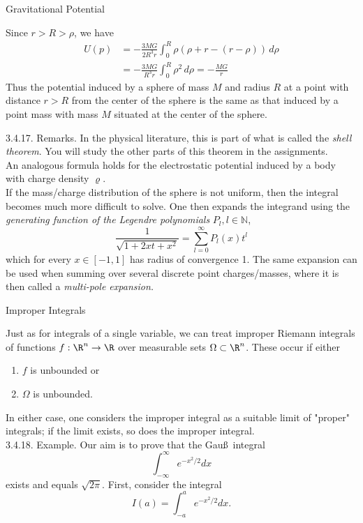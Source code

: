 \documentclass[smaller,hyperref={CJKbookmarks=true}]{beamer}
\newcommand{\N}{\mathbb{N}}
\begin{document}
\begin{frame}{Gravitational Potential}
\begin{spacing}{0.9}
Since $r>R>\rho$, we have
\begin{equation*}
  \begin{split}
     U(p) &=-\frac{3MG}{2R^3r}\int_{0}^{R}\rho(\rho+r-(r-\rho))\,d\rho \\
       &=-\frac{3MG}{R^3r}\int_{0}^{R}\rho^2\,d\rho=-\frac{MG}{r}
  \end{split}
\end{equation*}
Thus the potential induced by a sphere of mass $M$ and radius $R$ at a point with distance $r>R$ from the center of the sphere is the same as that induced by a point mass with mass $M$ situated at the center of the sphere.
\end{spacing}
\newpage
\begin{spacing}{1.05}
\alert{3.4.17. Remarks.} In the physical literature, this is part of what is called the
\emph{shell theorem}. You will study the other parts of this theorem in the
assignments.\\[5pt]
An analogous formula holds for the electrostatic potential induced by a
body with charge density $\varrho$.\\[5pt]
If the mass/charge distribution of the sphere is not uniform, then the
integral becomes much more dif{}ficult to solve. One then expands the
integrand using the \emph{generating function of the Legendre polynomials} $P_l,l\in\N$,
\[\frac{1}{\sqrt{1+2xt+x^2}}=\sum_{l=0}^{\infty}
P_l(x)t^l\]
which for every $x\in[-1,1]$ has radius of convergence 1. The same expansion can be used when summing over several discrete point charges/masses, where it is then called a \emph{multi-pole expansion.}
\end{spacing}
\end{frame}
\begin{frame}[t]{Improper Integrals}
\begin{spacing}{1.05}
Just as for integrals of a single variable, we can treat improper Riemann
integrals of functions $f:\R^n\to\R$ over measurable sets $\Omega\subset\R^n$. These occur if either
\begin{enumerate}[1.]
  \item $f$ is unbounded or
  \item $\Omega$ is unbounded.
\end{enumerate}
In either case, one considers the improper integral as a suitable limit of
"proper" integrals; if the limit exists, so does the improper integral.\\[5pt]
\alert{3.4.18. Example.} Our aim is to prove that the Gau\ss~integral
\[\int_{-\infty}^{\infty}e^{-x^2/2}dx\]
exists and equals $\sqrt{2\pi}$. First, consider the integral
\[I(a)=\int_{-a}^{a}e^{-x^2/2}dx.\]
\end{spacing}
\end{frame}
\end{document}
